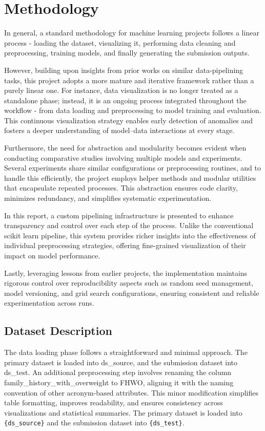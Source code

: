 \chapter{Methodology}\label{ch:methodology}


In general, a standard methodology for machine learning projects follows a linear process - loading the dataset, visualizing it, performing data cleaning and preprocessing, training models, and finally generating the submission outputs.

However, building upon insights from prior works on similar data-pipelining tasks, this project adopts a more mature and iterative framework rather than a purely linear one.
For instance, data visualization is no longer treated as a standalone phase; instead, it is an ongoing process integrated throughout the workflow - from data loading and preprocessing to model training and evaluation.
This continuous visualization strategy enables early detection of anomalies and fosters a deeper understanding of model–data interactions at every stage.

Furthermore, the need for abstraction and modularity becomes evident when conducting comparative studies involving multiple models and experiments.
Several experiments share similar configurations or preprocessing routines, and to handle this efficiently, the project employs helper methods and modular utilities that encapsulate repeated processes.
This abstraction ensures code clarity, minimizes redundancy, and simplifies systematic experimentation.

In this report, a custom pipelining infrastructure is presented to enhance transparency and control over each step of the process.
Unlike the conventional scikit learn pipeline, this system provides richer insights into the effectiveness of individual preprocessing strategies, offering fine-grained visualization of their impact on model performance.

Lastly, leveraging lessons from earlier projects, the implementation maintains rigorous control over reproducibility aspects such as random seed management, model versioning, and grid search configurations, ensuring consistent and reliable experimentation across runs.



\section{Dataset Description}\label{sec:dataset-description}
The data loading phase follows a straightforward and minimal approach.
The primary dataset is loaded into {ds_source}, and the submission dataset into {ds_test}.
An additional preprocessing step involves renaming the column family_history_with_overweight to FHWO, aligning it with the naming convention of other acronym-based attributes.
This minor modification simplifies table formatting, improves readability, and ensures consistency across visualizations and statistical summaries.
The primary dataset is loaded into \texttt{\{ds\_source\}} and the submission dataset into \texttt{\{ds\_test\}}.


